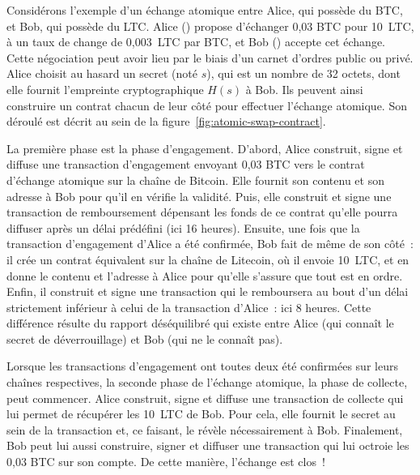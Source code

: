 Considérons l'exemple d'un échange atomique entre Alice, qui possède du BTC, et Bob, qui possède du LTC. Alice () propose d'échanger 0,03 BTC pour 10~LTC, à un taux de change de 0,003~LTC par BTC, et Bob () accepte cet échange. Cette négociation peut avoir lieu par le biais d'un carnet d'ordres public ou privé. Alice choisit au hasard un secret (noté $s$), qui est un nombre de 32 octets, dont elle fournit l'empreinte cryptographique $H(s)$ à Bob. Ils peuvent ainsi construire un contrat chacun de leur côté pour effectuer l'échange atomique. Son déroulé est décrit au sein de la figure~\ref{fig:atomic-swap-contract}.

La première phase est la phase d'engagement. D'abord, Alice construit, signe et diffuse une transaction d'engagement envoyant 0,03 BTC vers le contrat d'échange atomique sur la chaîne de Bitcoin. Elle fournit son contenu et son adresse à Bob pour qu'il en vérifie la validité. Puis, elle construit et signe une transaction de remboursement dépensant les fonds de ce contrat qu'elle pourra diffuser après un délai prédéfini (ici 16 heures). Ensuite, une fois que la transaction d'engagement d'Alice a été confirmée, Bob fait de même de son côté~: il crée un contrat équivalent sur la chaîne de Litecoin, où il envoie 10~LTC, et en donne le contenu et l'adresse à Alice pour qu'elle s'assure que tout est en ordre. Enfin, il construit et signe une transaction qui le remboursera au bout d'un délai strictement inférieur à celui de la transaction d'Alice~: ici 8 heures. Cette différence résulte du rapport déséquilibré qui existe entre Alice (qui connaît le secret de déverrouillage) et Bob (qui ne le connaît pas).

Lorsque les transactions d'engagement ont toutes deux été confirmées sur leurs chaînes respectives, la seconde phase de l'échange atomique, la phase de collecte, peut commencer. Alice construit, signe et diffuse une transaction de collecte qui lui permet de récupérer les 10~LTC de Bob. Pour cela, elle fournit le secret au sein de la transaction et, ce faisant, le révèle nécessairement à Bob. Finalement, Bob peut lui aussi construire, signer et diffuser une transaction qui lui octroie les 0,03 BTC sur son compte. De cette manière, l'échange est clos~!

